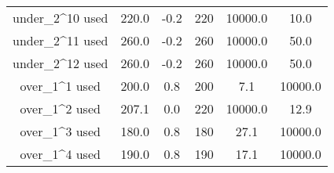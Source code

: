\documentclass[
]{article}
\begin{document}
\begin{longtable}{cccccc}
under\_2\textasciicircum{}10 used & 220.0 & -0.2 & 220 & 10000.0 & 10.0\\
\addlinespace
under\_2\textasciicircum{}11 used & 260.0 & -0.2 & 260 & 10000.0 & 50.0\\
under\_2\textasciicircum{}12 used & 260.0 & -0.2 & 260 & 10000.0 & 50.0\\
over\_1\textasciicircum{}1 used & 200.0 & 0.8 & 200 & 7.1 & 10000.0\\
over\_1\textasciicircum{}2 used & 207.1 & 0.0 & 220 & 10000.0 & 12.9\\
over\_1\textasciicircum{}3 used & 180.0 & 0.8 & 180 & 27.1 & 10000.0\\
\addlinespace
over\_1\textasciicircum{}4 used & 190.0 & 0.8 & 190 & 17.1 & 10000.0\\*
\end{longtable}
\endgroup{}
\end{document}
